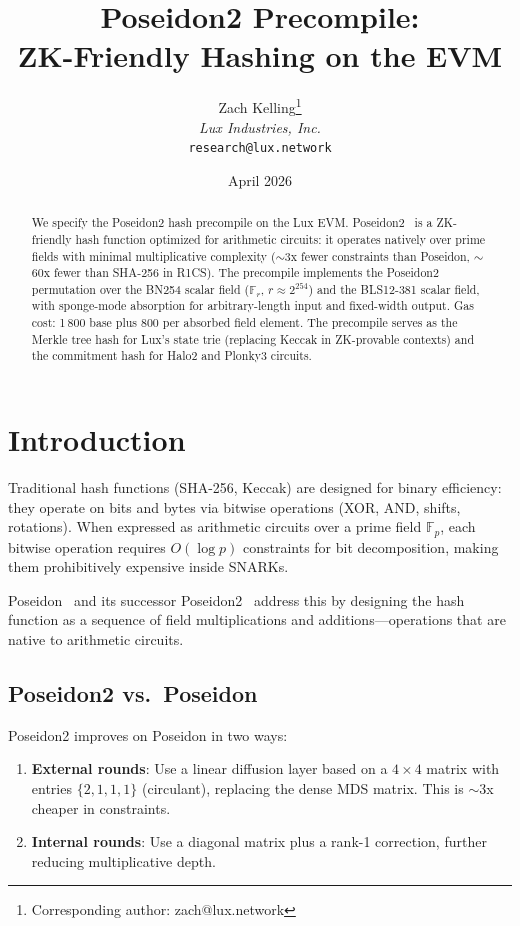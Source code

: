 \documentclass[11pt,a4paper]{article}
\title{Poseidon2 Precompile:\\ZK-Friendly Hashing on the EVM}
\author{
Zach Kelling\thanks{Corresponding author: zach@lux.network}\\
\textit{Lux Industries, Inc.}\\
\texttt{research@lux.network}
}
\date{April 2026}
\begin{document}
\luxcoverpage

\begin{abstract}
We specify the Poseidon2 hash precompile on the Lux EVM. Poseidon2~\cite{poseidon2}
is a ZK-friendly hash function optimized for arithmetic circuits: it operates
natively over prime fields with minimal multiplicative complexity ($\sim$3x fewer
constraints than Poseidon, $\sim$60x fewer than SHA-256 in R1CS). The precompile
implements the Poseidon2 permutation over the BN254 scalar field
($\mathbb{F}_r$, $r \approx 2^{254}$) and the BLS12-381 scalar field, with
sponge-mode absorption for arbitrary-length input and fixed-width output.
Gas cost: 1\,800 base plus 800 per absorbed field element. The precompile
serves as the Merkle tree hash for Lux's state trie (replacing Keccak in
ZK-provable contexts) and the commitment hash for Halo2 and Plonky3 circuits.
\end{abstract}

\section{Introduction}

Traditional hash functions (SHA-256, Keccak) are designed for binary efficiency:
they operate on bits and bytes via bitwise operations (XOR, AND, shifts, rotations).
When expressed as arithmetic circuits over a prime field $\mathbb{F}_p$, each
bitwise operation requires $O(\log p)$ constraints for bit decomposition, making
them prohibitively expensive inside SNARKs.

Poseidon~\cite{poseidon} and its successor Poseidon2~\cite{poseidon2} address
this by designing the hash function as a sequence of field multiplications and
additions---operations that are native to arithmetic circuits.

\subsection{Poseidon2 vs.\ Poseidon}

Poseidon2 improves on Poseidon in two ways:
\begin{enumerate}
  \item \textbf{External rounds}: Use a linear diffusion layer based on a
    $4 \times 4$ matrix with entries $\{2, 1, 1, 1\}$ (circulant), replacing
    the dense MDS matrix. This is $\sim$3x cheaper in constraints.
  \item \textbf{Internal rounds}: Use a diagonal matrix plus a rank-1 correction,
    further reducing multiplicative depth.
\end{enumerate}
\end{document}
